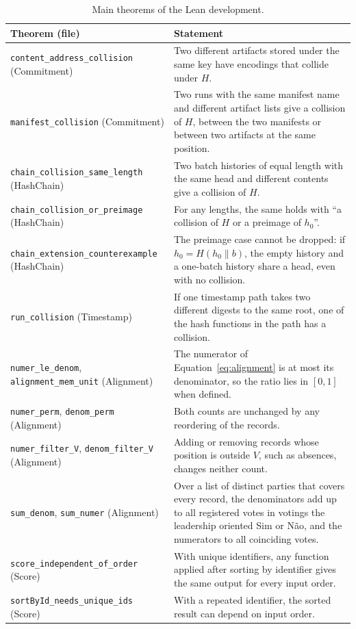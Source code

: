 \documentclass[11pt,a4paper]{article}
\begin{document}
\begin{table}[ht]
\centering
\small
\begin{tabularx}{\textwidth}{@{}>{\raggedright\arraybackslash}p{5.8cm}>{\raggedright\arraybackslash}X@{}}
\toprule
Theorem (file) & Statement \\
\midrule
\texttt{content\_address\_collision} (Commitment) & Two different artifacts stored under the same key have encodings that collide under $H$. \\
\addlinespace[2pt]
\texttt{manifest\_collision} (Commitment) & Two runs with the same manifest name and different artifact lists give a collision of $H$, between the two manifests or between two artifacts at the same position. \\
\addlinespace[2pt]
\texttt{chain\_collision\_same\_length} (HashChain) & Two batch histories of equal length with the same head and different contents give a collision of $H$. \\
\addlinespace[2pt]
\texttt{chain\_collision\_or\_preimage} (HashChain) & For any lengths, the same holds with ``a collision of $H$ or a preimage of $h_0$''. \\
\addlinespace[2pt]
\texttt{chain\_extension\_counterexample} (HashChain) & The preimage case cannot be dropped: if $h_0=H(h_0\|b)$, the empty history and a one-batch history share a head, even with no collision. \\
\addlinespace[2pt]
\texttt{run\_collision} (Timestamp) & If one timestamp path takes two different digests to the same root, one of the hash functions in the path has a collision. \\
\addlinespace[2pt]
\texttt{numer\_le\_denom}, \texttt{alignment\_mem\_unit} (Alignment) & The numerator of Equation~\ref{eq:alignment} is at most its denominator, so the ratio lies in $[0,1]$ when defined. \\
\addlinespace[2pt]
\texttt{numer\_perm}, \texttt{denom\_perm} (Alignment) & Both counts are unchanged by any reordering of the records. \\
\addlinespace[2pt]
\texttt{numer\_filter\_V}, \texttt{denom\_filter\_V} (Alignment) & Adding or removing records whose position is outside $V$, such as absences, changes neither count. \\
\addlinespace[2pt]
\texttt{sum\_denom}, \texttt{sum\_numer} (Alignment) & Over a list of distinct parties that covers every record, the denominators add up to all registered votes in votings the leadership oriented Sim or N\~ao, and the numerators to all coinciding votes. \\
\addlinespace[2pt]
\texttt{score\_independent\_of\_order} (Score) & With unique identifiers, any function applied after sorting by identifier gives the same output for every input order. \\
\addlinespace[2pt]
\texttt{sortById\_needs\_unique\_ids} (Score) & With a repeated identifier, the sorted result can depend on input order. \\
\bottomrule
\end{tabularx}
\caption{Main theorems of the Lean development.}
\label{tab:lean}
\end{table}
\end{document}
